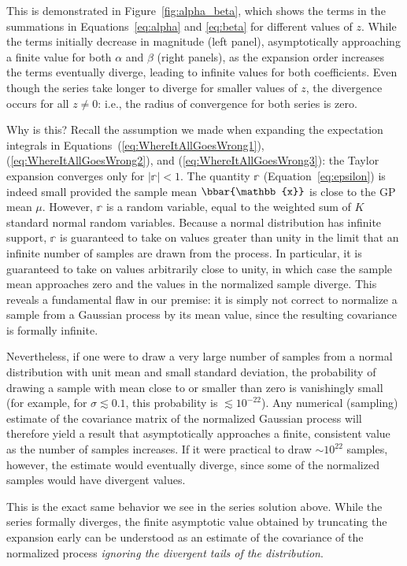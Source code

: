 \documentclass[modern]{aastex62}
\begin{document}
%
This is demonstrated in Figure~\ref{fig:alpha_beta}, which shows the
terms in the summations in Equations~\ref{eq:alpha} and \ref{eq:beta} for
different values of $z$. While the terms initially decrease in magnitude
(left panel), asymptotically approaching a finite value for both
$\alpha$ and $\beta$ (right panels), as the expansion order increases
the terms eventually diverge, leading to infinite values for both
coefficients. Even though the series take longer to diverge for smaller
values of $z$, the divergence occurs for all $z \ne 0$: i.e., the radius
of convergence for both series is zero.

Why is this? Recall the assumption we made when expanding the expectation
integrals in Equations~(\ref{eq:WhereItAllGoesWrong1}), (\ref{eq:WhereItAllGoesWrong2}),
and (\ref{eq:WhereItAllGoesWrong3}): the Taylor expansion converges only for
$\big|\mathbb{r}| < 1$. The quantity $\mathbb{r}$ (Equation~\ref{eq:epsilon})
is indeed small provided the sample mean $\bbar{\mathbb{x}}$ is close to the GP
mean $\mu$. However, $\mathbb{r}$ is a random variable, equal to
the weighted sum of $K$ standard normal random variables. Because a normal
distribution has infinite support, $\mathbb{r}$ is guaranteed to take on
values greater than unity in the limit that an infinite number of samples
are drawn from the process. In particular, it is guaranteed to take on values
arbitrarily close to unity, in which case the sample mean approaches zero and
the values in the normalized sample diverge.
This reveals a fundamental flaw in our premise:
it is simply not correct to normalize a sample from a Gaussian process by its
mean value, since the resulting covariance is formally infinite.

Nevertheless, if one were to draw a very large number of samples from a normal
distribution with unit mean and small standard deviation,
the probability of drawing a sample with mean close to or smaller than zero
is vanishingly small (for example, for $\sigma \lesssim 0.1$, this probability
is $\lesssim 10^{-22}$).
Any numerical (sampling) estimate of the
covariance matrix of the normalized Gaussian process will therefore yield
a result that asymptotically approaches a finite, consistent value as the
number of samples increases. If it were practical to draw
$\sim 10^{22}$ samples, however, the estimate would eventually diverge, since
some of the normalized samples would have divergent values.

This is the exact same behavior we see in the series solution above.
While the series formally diverges, the finite asymptotic value obtained
by truncating the expansion early can be understood as an estimate of
the covariance of the normalized process \emph{ignoring the divergent
    tails of the distribution}.
\end{document}
